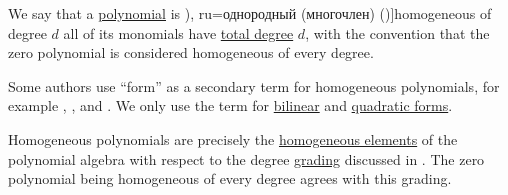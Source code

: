 \begin{definition}\label{def:homogeneous_polynomial}
  We say that a \hyperref[def:polynomial_algebra]{polynomial} is \term[bg=хомогенен (полином) (\cite[58]{ГеновМиховскиМоллов1991Алгебра}), ru=однородный (многочлен) (\cite[314]{Курош1968ВысшаяАлгебра})]{homogeneous} of degree \( d \) all of its monomials have \hyperref[def:polynomial_degree]{total degree} \( d \), with the convention that the zero polynomial is considered homogeneous of every degree.
\end{definition}
\begin{comments}
  \item Some authors use \enquote{form} as a secondary term for homogeneous polynomials, for example , ,  and . We only use the term for \hyperref[def:bilinear_form]{bilinear} and \hyperref[def:quadratic_form]{quadratic forms}.

  \item Homogeneous polynomials are precisely the \hyperref[def:homogeneous_element]{homogeneous elements} of the polynomial algebra with respect to the degree \hyperref[def:algebra_grading]{grading} discussed in . The zero polynomial being homogeneous of every degree agrees with this grading.
\end{comments}


